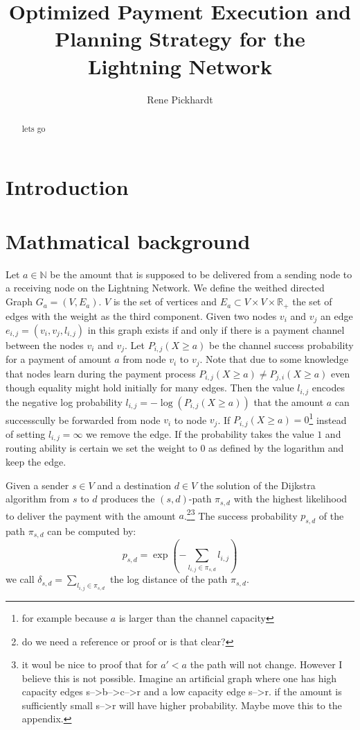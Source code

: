 \documentclass[10pt,twocolumn]{article}
\title{Optimized Payment Execution and Planning Strategy for the Lightning Network}
\begin{document}
 

\author{Rene Pickhardt}

\maketitle

 
\begin{abstract}
lets go
\end{abstract}

\section{Introduction}

\section{Mathmatical background}
Let $a\in\mathbb{N}$ be the amount that is supposed to be delivered from a sending node to a receiving node on the Lightning Network.
We define the weithed directed Graph $G_a = (V,E_a)$. 
$V$ is the set of vertices and $E_a\subset V\times V \times \mathbb{R}_+$ the set of edges with the weight as the third component.
Given two nodes $v_i$ and $v_j$ an edge $e_{i,j}=(v_i,v_j,l_{i,j})$ in this graph exists if and only if there is a payment channel between the nodes $v_i$ and $v_j$.
Let $P_{i,j}(X\geq a)$ be the channel success probability for a payment of amount $a$ from node $v_i$ to $v_j$.
Note that due to some knowledge that nodes learn during the payment process $P_{i,j}(X\geq a) \neq P_{j,i}(X\geq a)$ even though equality might hold initially for many edges.
Then the value $l_{i,j}$ encodes the negative log probability $l_{i,j} = - \log(P_{i,j}(X\geq a))$ that the amount $a$ can successcully be forwarded from node $v_i$ to node $v_j$.
If $P_{i,j}(X\geq a) = 0$\footnote{for example because $a$ is larger than the channel capacity} instead of setting $l_{i,j}=\infty$ we remove the edge.
If the probability takes the value $1$ and routing ability is certain we set the weight to $0$ as defined by the logarithm and keep the edge.

Given a sender $s \in V$  and a destination $d\in V$ the solution of the Dijkstra algorithm from $s$ to $d$ produces the $(s,d)$-path $\pi_{s,d}$ with the highest likelihood to deliver the payment with the amount $a$.\footnote{do we need a reference or proof or is that clear?}\footnote{it woul be nice to proof that for $a'<a$ the path will not change. However I believe this is not possible. Imagine an artificial graph where one has high capacity edges s-->b-->c-->r and a low capacity edge s-->r. if the amount is sufficiently small s-->r will have higher probability. Maybe move this to the appendix.}
The success probability $p_{s,d}$ of the path $\pi_{s,d}$ can be computed by:
\[
p_{s,d} = \exp\left(-\sum_{l_{i,j}\in \pi_{s,d}}l_{i,j}\right)
\]
we call $\delta_{s,d} = \sum_{l_{i,j}\in \pi_{s,d}}$ the log distance of the path $\pi_{s,d}$.
\end{document}
